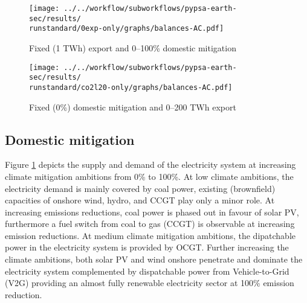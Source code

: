 \begin{figure*}[h!]
    \centering
    \begin{subfigure}[b]{0.49\linewidth}
        \centering
        \texttt{[image: ../../workflow/subworkflows/pypsa-earth-sec/results/\\runstandard/0exp-only/graphs/balances-AC.pdf]}
        \caption{Fixed (1 TWh) export and 0--100\% domestic mitigation}
        \label{fig:balances-ac-0exp}
    \end{subfigure}
    \hfill
    \begin{subfigure}[b]{0.49\linewidth}
        \centering
        \texttt{[image: ../../workflow/subworkflows/pypsa-earth-sec/results/\\runstandard/co2l20-only/graphs/balances-AC.pdf]}
        \caption{Fixed (0\%) domestic mitigation and 0--200 TWh export}
        \label{fig:balances-ac-co2l20}
    \end{subfigure}
    \hfill
    \caption{Electricity supply and demand at fixed export levels and increasing domestic mitigation export (\ref{fig:balances-ac-0exp}) and vice versa (\ref{fig:balances-ac-co2l20}). Increasing domestic mitigation first phases out carbon-intensive coal generation in favor of CCGT, at medium to high mitigation the electricity system is fully renewable supported by flexibility through V2G and sector coupling. Increasing electricity demands cover EVs and hydrogen generation for other sectors.
    At increasing hydrogen exports the additional electricity required for hydrogen electrolysis is covered by onshore wind and solar PV, as imposed by the hydrogen regulation. 
    }
    \label{fig:balances-ac}
\end{figure*}


\subsection{Domestic mitigation}
\label{subsec:increase_limit}

Figure \ref{fig:balances-ac-0exp} depicts the supply and demand of the electricity system at increasing climate mitigation ambitions from 0\% to 100\%. At low climate ambitions, the electricity demand is mainly covered by coal power, existing (brownfield) capacities of onshore wind, hydro, and CCGT play only a minor role. 
At increasing emissions reductions, coal power is phased out in favour of solar PV, furthermore a fuel switch from coal to gas (CCGT) is observable at increasing emission reductions. At medium climate mitigation ambitions, the dipatchable power in the electricity system is provided by OCGT. 
Further increasing the climate ambitions, both solar PV and wind onshore penetrate and dominate the electricity system complemented by dispatchable power from Vehicle-to-Grid (V2G) providing an almost fully renewable electricity sector at 100\% emission reduction. 

